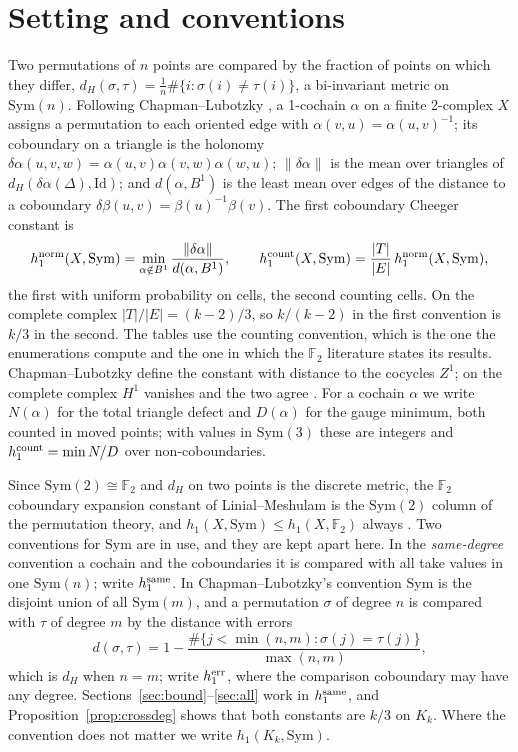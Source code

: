 \documentclass[11pt]{article}
\theoremstyle{remark}\newtheorem{remark}[theorem]{Remark}
\newcommand{\Sym}{\mathrm{Sym}}\newcommand{\dH}{d_H}\newcommand{\F}{\mathbb{F}}\newcommand{\Z}{\mathbb{Z}}
\newcommand{\Id}{\mathrm{Id}}\newcommand{\Tr}{\operatorname{Tr}}
\begin{document}
\begin{abstract}
Grassmannian geodesic distance; and a fixed-probe response that reads the spectral measure seen by the probe and so separates isospectral defects. None of them obstructs approximation. Grades: [T] derived, [V] computed, [L] kernel-checked in Lean, [C] cited.
\end{abstract}

\section{Setting and conventions}
Two permutations of $n$ points are compared by the fraction of points on which they differ,
$\dH(\sigma,\tau)=\tfrac1n\#\{i:\sigma(i)\ne\tau(i)\}$, a bi-invariant metric on $\Sym(n)$. Following Chapman--Lubotzky \cite{CL1,CL2}, a 1-cochain $\alpha$ on a finite 2-complex $X$ assigns a permutation to each oriented edge with $\alpha(v,u)=\alpha(u,v)^{-1}$; its coboundary on a triangle is the holonomy $\delta\alpha(u,v,w)=\alpha(u,v)\alpha(v,w)\alpha(w,u)$; $\|\delta\alpha\|$ is the mean over triangles of $\dH(\delta\alpha(\Delta),\Id)$; and $d(\alpha,B^1)$ is the least mean over edges of the distance to a coboundary $\delta\beta(u,v)=\beta(u)^{-1}\beta(v)$. The first coboundary Cheeger constant is
\[
h_1^{\rm norm}(X,\Sym)=\min_{\alpha\notin B^1}\frac{\|\delta\alpha\|}{d(\alpha,B^1)},\qquad h_1^{\rm count}(X,\Sym)=\frac{|T|}{|E|}\,h_1^{\rm norm}(X,\Sym),
\]
the first with uniform probability on cells, the second counting cells. On the complete complex $|T|/|E|=(k-2)/3$, so $k/(k-2)$ in the first convention is $k/3$ in the second. The tables use the counting convention, which is the one the enumerations compute and the one in which the $\F_2$ literature states its results. Chapman--Lubotzky define the constant with distance to the cocycles $Z^1$; on the complete complex $H^1$ vanishes and the two agree \cite[Cor.~4.1]{CL2}. For a cochain $\alpha$ we write $N(\alpha)$ for the total triangle defect and $D(\alpha)$ for the gauge minimum, both counted in moved points; with values in $\Sym(3)$ these are integers and $h_1^{\rm count}=\min N/D$ over non-coboundaries.

Since $\Sym(2)\cong\F_2$ and $\dH$ on two points is the discrete metric, the $\F_2$ coboundary expansion constant of Linial--Meshulam \cite{LM} is the $\Sym(2)$ column of the permutation theory, and $h_1(X,\Sym)\le h_1(X,\F_2)$ always \cite[footnote 2]{CL2}. Two conventions for $\Sym$ are in use, and they are kept apart here. In the \emph{same-degree} convention a cochain and the coboundaries it is compared with all take values in one $\Sym(n)$; write $h_1^{\rm same}$. In Chapman--Lubotzky's convention $\Sym$ is the disjoint union of all $\Sym(m)$, and a permutation $\sigma$ of degree $n$ is compared with $\tau$ of degree $m$ by the distance with errors
\[
d(\sigma,\tau)=1-\frac{\#\{j<\min(n,m):\sigma(j)=\tau(j)\}}{\max(n,m)},
\]
which is $\dH$ when $n=m$; write $h_1^{\rm err}$, where the comparison coboundary may have any degree. Sections~\ref{sec:bound}--\ref{sec:all} work in $h_1^{\rm same}$, and Proposition~\ref{prop:crossdeg} shows that both constants are $k/3$ on $K_k$. Where the convention does not matter we write $h_1(K_k,\Sym)$.
\end{document}
